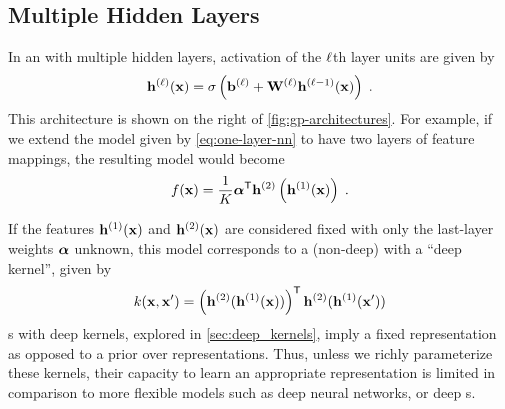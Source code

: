 





\subsection{Multiple Hidden Layers}

In an \MLP{} with multiple hidden layers, activation of the $\ell$th layer units are given by
%
\begin{align}
{\bf{h}}^{(\ell)}({\bf{x}}) = \sigma \left( {\bf{b}}^{(\ell)} + \mathbf{W}^{(\ell)} {\bf{h}}^{(\ell-1)}({\bf{x}}) \right) \;.
\label{eq:nextlayer}
\end{align}
This architecture is shown on the right of \cref{fig:gp-architectures}.
%
For example, if we extend the model given by \cref{eq:one-layer-nn} to have two layers of feature mappings,  the resulting model would become
%
\begin{align}
f({\bf{x}}) = \frac{1}{K}{\mathbf {\boldsymbol{\alpha}}}^{\mathsf{T}} {\bf{h}}^{(2)}\left( {\bf{h}}^{(1)}({\bf{x}}) \right) \;.
\label{eq:mutli-layer-nn}
\end{align}

If the features ${\bf{h}}^{(1)}({\bf{x}})$ and ${\bf{h}}^{(2)}({\bf{x}})$ are considered fixed with only the last-layer weights ${\boldsymbol{\alpha}}$ unknown, this model corresponds to a (non-deep) \gp{} with a ``deep kernel'', given by
\begin{align}
k({\bf{x}}, {\bf{x}}') = \left( {\bf{h}}^{(2)} ( {\bf{h}}^{(1)}({\bf{x}}) ) \right) ^{\mathsf{T}} {\bf{h}}^{(2)} ({\bf{h}}^{(1)}({\bf{x}}') )
\end{align}
\gp{}s with deep kernels, explored in \cref{sec:deep_kernels}, imply a fixed representation as opposed to a prior over representations.
Thus, unless we richly parameterize these kernels, their capacity to learn an appropriate representation is limited in comparison to more flexible models such as deep neural networks, or deep \gp{}s. %



